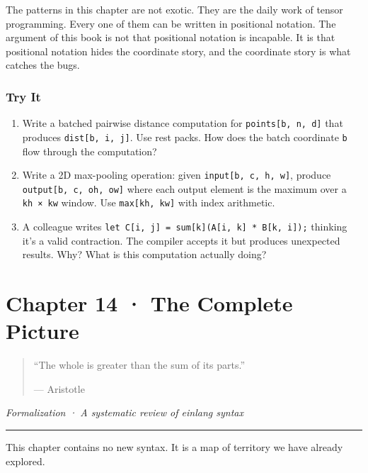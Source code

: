 \documentclass[11pt,]{article}
\begin{document}
The patterns in this chapter are not exotic. They are the daily work of
tensor programming. Every one of them can be written in positional
notation. The argument of this book is not that positional notation is
incapable. It is that positional notation hides the coordinate story,
and the coordinate story is what catches the bugs.

\hypertarget{try-it-12}{%
\subsubsection{Try It}\label{try-it-12}}

\begin{enumerate}
\def\labelenumi{\arabic{enumi}.}
\item
  Write a batched pairwise distance computation for
  \texttt{points{[}b,\ n,\ d{]}} that produces
  \texttt{dist{[}b,\ i,\ j{]}}. Use rest packs. How does the batch
  coordinate \texttt{b} flow through the computation?
\item
  Write a 2D max-pooling operation: given
  \texttt{input{[}b,\ c,\ h,\ w{]}}, produce
  \texttt{output{[}b,\ c,\ oh,\ ow{]}} where each output element is the
  maximum over a \texttt{kh\ ×\ kw} window. Use
  \texttt{max{[}kh,\ kw{]}} with index arithmetic.
\item
  A colleague writes
  \texttt{let\ C{[}i,\ j{]}\ =\ sum{[}k{]}(A{[}i,\ k{]}\ *\ B{[}k,\ i{]});}
  thinking it's a valid contraction. The compiler accepts it but
  produces unexpected results. Why? What is this computation actually
  doing?
\end{enumerate}

\newpage

\hypertarget{chapter-14-the-complete-picture}{%
\section{Chapter 14 · The Complete
Picture}\label{chapter-14-the-complete-picture}}

\begin{quote}
``The whole is greater than the sum of its parts.''

--- Aristotle
\end{quote}

\emph{Formalization · A systematic review of einlang syntax}

\begin{center}\rule{0.5\linewidth}{0.4pt}\end{center}

This chapter contains no new syntax. It is a map of territory we have
already explored.
\end{document}

